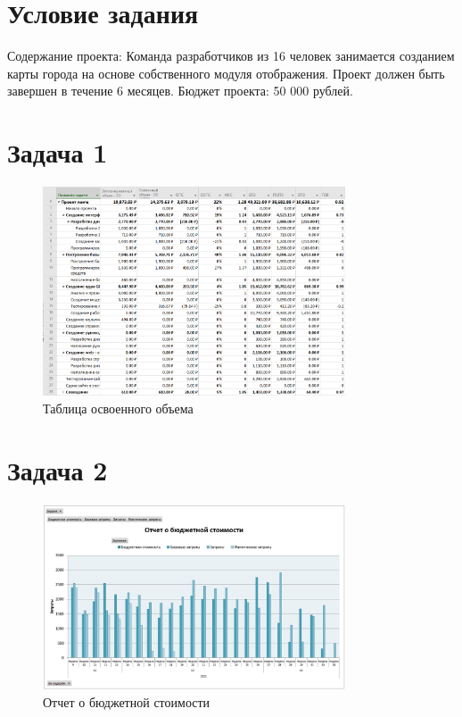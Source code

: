 \section{Условие задания}

Содержание проекта: Команда разработчиков из 16 человек занимается созданием карты города на основе собственного модуля отображения. Проект должен быть завершен в течение 6 месяцев. Бюджет проекта: 50 000 рублей.

\section{Задача 1}

\begin{figure}[H]
    \centering
    \includegraphics[width=0.8\textwidth]{img/content/task_01.png}
    \caption{Таблица освоенного объема}
    \label{fig:task_01}
\end{figure}

\section{Задача 2}

\begin{figure}[H]
    \centering
    \includegraphics[width=0.8\textwidth]{img/content/task_02_1.png}
    \caption{Отчет о бюджетной стоимости}
    \label{fig:task_02_1}
\end{figure}

